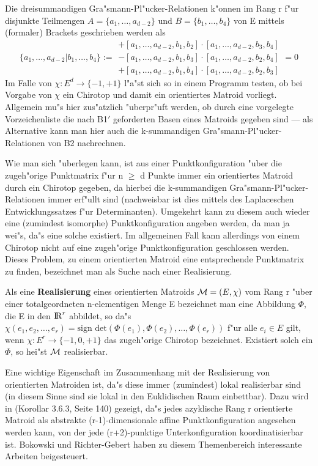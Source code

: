 Die dreisummandigen Gra"smann-Pl"ucker-Relationen k"onnen im Rang r f"ur
disjunkte Teilmengen $A=\{a_1,\ldots,a_{d-2}\}$ und $B=\{b_1,\ldots,b_4\}$
von E mittels (formaler) Brackets geschrieben werden als
$$\{a_1,\ldots,a_{d-2}|b_1,\ldots,b_4\}:=
  \begin{array}{l}
    +[a_1,\ldots,a_{d-2},b_1,b_2]\cdot [a_1,\ldots,a_{d-2},b_3,b_4]\\
    -[a_1,\ldots,a_{d-2},b_1,b_3]\cdot [a_1,\ldots,a_{d-2},b_2,b_4]\\
    +[a_1,\ldots,a_{d-2},b_1,b_4]\cdot [a_1,\ldots,a_{d-2},b_2,b_3]
  \end{array}=0$$
Im Falle von $\chi:E^d\to\{-1,+1\}$ l"a"st sich so in einem Programm testen,
ob bei Vorgabe von $\chi$ ein Chirotop und damit ein orientiertes Matroid
vorliegt. Allgemein mu"s hier zus"atzlich "uberpr"uft werden, ob durch eine
vorgelegte Vorzeichenliste die nach B1$'$ geforderten Basen eines Matroids
gegeben sind --- als Alternative kann man hier auch die k-summandigen
Gra"smann-Pl"ucker-Relationen von B2 nachrechnen.

Wie man sich "uberlegen kann, ist aus einer Punktkonfiguration "uber die
zugeh"orige Punktmatrix f"ur n $\geq$ d Punkte immer ein orientiertes Matroid
durch ein Chirotop gegeben, da hierbei die k-summandigen
Gra"smann-Pl"ucker-Relationen immer erf"ullt sind (nachweisbar ist dies mittels
des Laplaceschen Entwicklungssatzes f"ur Determinanten). Umgekehrt kann
zu diesem auch wieder eine (zumindest isomorphe) Punktkonfiguration angeben
werden, da man ja wei"s, da"s eine solche existiert. Im allgemeinen Fall kann
allerdings von einem Chirotop nicht auf eine zugeh"orige Punktkonfiguration
geschlossen werden. Dieses Problem, zu einem orientierten Matroid eine
entsprechende Punktmatrix zu finden, bezeichnet man als Suche nach einer
Realisierung.\label{real}

Als eine {\bf Realisierung} eines orientierten Matroids
${\cal M}=(E,\chi)$ vom Rang r "uber einer totalgeordneten n-elementigen Menge
E bezeichnet man eine Abbildung $\Phi$, die E in den $\mbox{$\rm I\!R$}^r$ abbildet, so da"s
$\chi(e_1,e_2,\ldots,e_r)=\mbox{sign det}(\Phi(e_1),\Phi(e_2),\ldots,\Phi(e_r))$
f"ur alle $e_i\in E$ gilt, wenn $\chi:E^r\to\{-1,0,+1\}$ das zugeh"orige
Chirotop bezeichnet. Existiert solch ein $\Phi$, so hei"st $\cal M$
realisierbar.

{\scsi
Eine wichtige Eigenschaft im Zusammenhang mit der Realisierung von
orientierten Matroiden ist, da"s diese immer (zumindest) lokal realisierbar
sind (in diesem Sinne sind sie lokal in den Euklidischen Raum einbettbar). Dazu
wird in \cite{Bj:93} (Korollar 3.6.3, Seite 140) gezeigt, da"s jedes azyklische
Rang r orientierte Matroid als abstrakte (r-1)-dimensionale affine
Punktkonfiguration angesehen werden kann, von der jede (r+2)-punktige
Unterkonfiguration koordinatisierbar ist. Bokowski und Richter-Gebert haben
zu diesem Themenbereich interessante Arbeiten beigesteuert.
}

